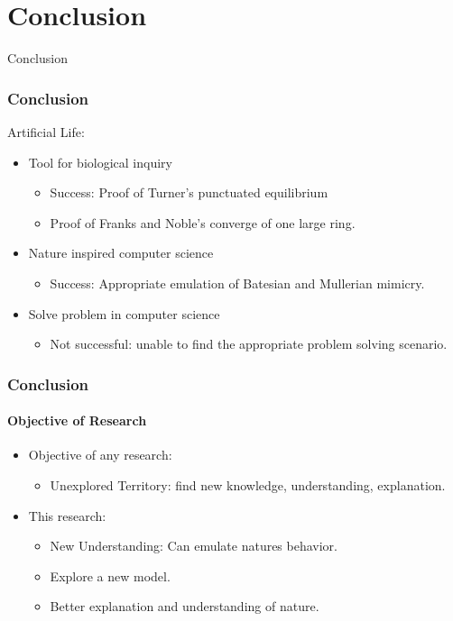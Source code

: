 \section{Conclusion}

\frame
{
	\begin{center}
		\LARGE Conclusion
	\end{center}
}

\frame
{
	\frametitle{Conclusion}
	
	Artificial Life:
	\begin{itemize}
		\item Tool for biological inquiry
			\begin{itemize}
				\item Success: Proof of Turner's punctuated equilibrium
				\item Proof of Franks and Noble's converge of one large ring.
			\end{itemize}
		\item Nature inspired computer science
			\begin{itemize}
				\item Success: Appropriate emulation of Batesian and Mullerian mimicry.
			\end{itemize}
		\item Solve problem in computer science
			\begin{itemize}
				\item Not successful: unable to find the appropriate problem solving scenario.
			\end{itemize}
	\end{itemize}
}

\frame
{
	\frametitle{Conclusion}
	\framesubtitle{Objective of Research}
	
	\begin{itemize}
		\item Objective of any research:
			\begin{itemize}
				\item Unexplored Territory: find new knowledge, understanding, explanation.
			\end{itemize}
		\item This research:
			\begin{itemize}
				\item New Understanding: Can emulate natures behavior.
				\item Explore a new model.
				\item Better explanation and understanding of nature.
			\end{itemize}
	\end{itemize}
}